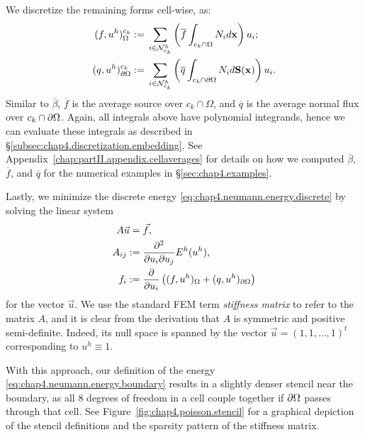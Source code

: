 We discretize the remaining forms cell-wise, as:
\begin{align*}
(f, u^h)^{c_k}_{\Omega} := {} & \sum_{i \in \mathcal{N}^h_{c_k}} \left( \overline{f} \int_{c_k \cap \Omega} N_i d\mathbf{x} \right) u_i; \\
(q, u^h)^{c_k}_{\partial\Omega} := {} & \sum_{i \in \mathcal{N}^h_{c_k}} \left( \overline{q} \int_{c_k \cap \partial\Omega} N_i d\mathbf{S}(\mathbf{x}) \right) u_i.
\end{align*}
Similar to $\overline{\beta}$, $\overline{f}$ is the average source over $c_k \cap \Omega$, and $\overline{q}$ is the average normal flux over $c_k \cap \partial\Omega$. Again, all integrals above have polynomial integrands, hence we can evaluate these integrals as described in \S\ref{subsec:chap4.discretization.embedding}. See Appendix~\ref{chap:partII.appendix.cellaverages} for details on how we computed $\overline{\beta}$, $\overline{f}$, and $\overline{q}$ for the numerical examples in \S\ref{sec:chap4.examples}.

Lastly, we minimize the discrete energy \eqref{eq:chap4.neumann.energy.discrete} by solving the linear system
\begin{equation} \label{eq:chap4.neumann.linear.system}
\begin{split}
A \vec{u} = {} & \vec{f}, \\
A_{ij} := {} & \frac{\partial^2 }{\partial u_i \partial u_j} E^h(u^h), \\
f_i := {} & \frac{\partial }{\partial u_i} \left( (f, u^h)_{\Omega} + (q, u^h)_{\partial\Omega} \right)
\end{split}
\end{equation}
for the vector $\vec{u}$. We use the standard FEM term \emph{stiffness matrix} to refer to the matrix $A$, and it is clear from the derivation that $A$ is symmetric and positive semi-definite. Indeed, its null space is spanned by the vector $\vec{u} = (1, 1, \dotsc, 1)^t$ corresponding to $u^h \equiv 1$.

With this approach, our definition of the energy \eqref{eq:chap4.neumann.energy.boundary} results in a slightly denser stencil near the boundary, as all $8$ degrees of freedom in a cell couple together if $\partial\Omega$ passes through that cell. See Figure~\ref{fig:chap4.poisson.stencil} for a graphical depiction of the stencil definitions and the sparsity pattern of the stiffness matrix.

